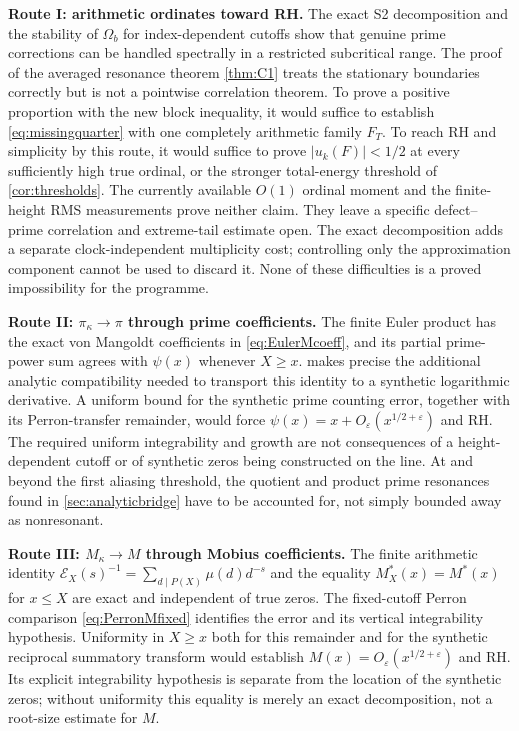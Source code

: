 \documentclass[11pt,reqno]{amsart}
\numberwithin{equation}{section}
\begin{document}
\noindent\textbf{Route I: arithmetic ordinates toward RH.}
The exact S2 decomposition and the stability of $\Omega_b$ for
index-dependent cutoffs show that genuine prime corrections can be
handled spectrally in a restricted subcritical range.  The proof of
the averaged resonance theorem \cref{thm:C1} treats the stationary
boundaries correctly but is not a pointwise correlation theorem.
To prove a positive proportion with the new block inequality, it
would suffice to establish \eqref{eq:missingquarter} with one
completely arithmetic family $F_T$.  To reach RH and simplicity by
this route, it would suffice to prove $|u_k(F)|<1/2$ at every
sufficiently high true ordinal, or the stronger total-energy
threshold of \cref{cor:thresholds}.  The currently available
$O(1)$ ordinal moment and the finite-height RMS measurements
prove neither claim.  They leave a specific defect--prime
correlation and extreme-tail estimate open.  The exact decomposition
adds a separate clock-independent multiplicity cost; controlling only
the approximation component cannot be used to discard it.  None of
these difficulties is a proved impossibility for the programme.

\medskip
\noindent\textbf{Route II: $\pi_{\kappa}\to\pi$ through prime coefficients.}
The finite Euler product has the exact von Mangoldt coefficients in
\eqref{eq:EulerMcoeff}, and its partial prime-power sum agrees with
$\psi(x)$ whenever $X\ge x$.
 makes precise the additional analytic
compatibility needed to transport this identity to a synthetic
logarithmic derivative.  A uniform bound for the synthetic prime
counting error, together with its Perron-transfer remainder, would
force $\psi(x)=x+O_\varepsilon(x^{1/2+\varepsilon})$ and RH.
The required uniform integrability and growth are not consequences
of a height-dependent cutoff or of synthetic zeros being
constructed on the line.  At and beyond the first aliasing
threshold, the quotient and product prime resonances found in
\cref{sec:analyticbridge} have to be accounted for, not simply
bounded away as nonresonant.

\medskip
\noindent\textbf{Route III: $M_{\kappa}\to M$ through Mobius coefficients.}
The finite arithmetic identity
$\mathscr E_X(s)^{-1}=\sum_{d\mid P(X)}\mu(d)d^{-s}$ and the equality
$M_X^*(x)=M^*(x)$ for $x\le X$ are exact and independent of true
zeros.  The fixed-cutoff Perron comparison
\eqref{eq:PerronMfixed} identifies the error and its vertical
integrability hypothesis.  Uniformity in $X\ge x$ both for this
remainder and for the synthetic reciprocal summatory transform
would establish $M(x)=O_\varepsilon(x^{1/2+\varepsilon})$ and RH.
Its explicit integrability hypothesis is separate from the location of the
synthetic zeros; without uniformity this equality is merely
an exact decomposition, not a root-size estimate for $M$.
\end{document}
